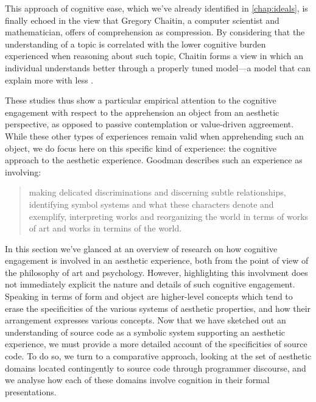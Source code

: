 This approach of cognitive ease, which we've already identified in \ref{chap:ideals}, is finally echoed in the view that Gregory Chaitin, a computer scientist and mathematician, offers of comprehension as compression. By considering that the understanding of a topic is correlated with the lower cognitive burden experienced when reasoning about such topic, Chaitin forms a view in which an individual understands better through a properly tuned model—a model that can explain more with less \citep{zenil_compression_2021}.

\spacer

These studies thus show a particular empirical attention to the cognitive engagement with respect to the apprehension an object from an aesthetic perspective, as opposed to passive contemplation or value-driven aggreement. While these other types of experiences remain valid when apprehending such an object, we do focus here on this specific kind of experience: the cognitive approach to the aesthetic experience. Goodman describes such an experience as involving:

\begin{quote}
    making delicated discriminations and discerning subtle relationships, identifying symbol systems and what these characters denote and exemplify, interpreting works and reorganizing the world in terms of works of art and works in termins of the world. \citep{goodman_languages_1976}
\end{quote}

\spacer

In this section we've glanced at an overview of research on how cognitive engagement is involved in an aesthetic experience, both from the point of view of the philosophy of art and psychology. However, highlighting this involvment does not immediately explicit the nature and details of such cognitive engagement. Speaking in terms of form and object are higher-level concepts which tend to erase the specificities of the various systems of aesthetic properties, and how their arrangement expresses various concepts. Now that we have sketched out an understanding of source code as a symbolic system supporting an aesthetic experience, we must provide a more detailed account of the specificities of source code. To do so, we turn to a comparative approach, looking at the set of aesthetic domains located contingently to source code through programmer discourse, and we analyse how each  of these domains involve cognition in their formal presentations.


